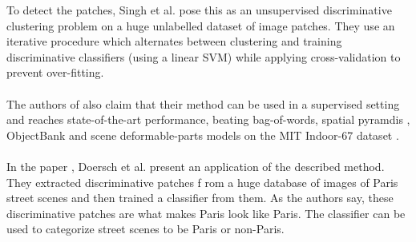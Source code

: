 To detect the patches, Singh et al. pose this as an unsupervised discriminative clustering problem on a huge unlabelled dataset of image patches.
They use an iterative procedure which alternates between clustering and training discriminative classifiers (using a linear SVM) while applying 
cross-validation to prevent over-fitting.\\
\\
The authors of \cite{Singh2012DiscPat} also claim that their method can be used in a supervised setting and reaches state-of-the-art performance,
beating bag-of-words, spatial pyramdis \cite{Lazebnik2006SpatialPyr}, ObjectBank \cite{Li2010ObjectBank} and scene deformable-parts models \cite{Pandey2011PartBased} on the MIT Indoor-67 dataset \cite{MITIndoor}.\\
\\
In the paper \cite{doersch2012what}, Doersch et al. present an application of the described method. They extracted discriminative patches f
rom a huge database of images of Paris street scenes and then trained a classifier from them. As the authors say, these discriminative
patches are what makes Paris look like Paris. The classifier can be used to categorize street scenes to be Paris or non-Paris.